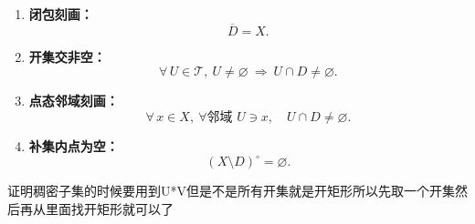 \begin{enumerate}
  \item \textbf{闭包刻画：}
  \[
  \overline D = X.
  \]

  \item \textbf{开集交非空：}
  \[
  \forall\, U\in\mathcal T,\ U\neq\varnothing \ \Longrightarrow\ U\cap D\neq\varnothing.
  \]

  \item \textbf{点态邻域刻画：}
  \[
  \forall\, x\in X,\ \forall\text{邻域 }U\ni x,\quad U\cap D\neq\varnothing.
  \]

  \item \textbf{补集内点为空：}
  \[
  (X\setminus D)^\circ=\varnothing.
  \]
  
\end{enumerate}
\begin{dxtips}
    证明稠密子集的时候要用到U*V但是不是所有开集就是开矩形所以先取一个开集然后再从里面找开矩形就可以了
\end{dxtips}

